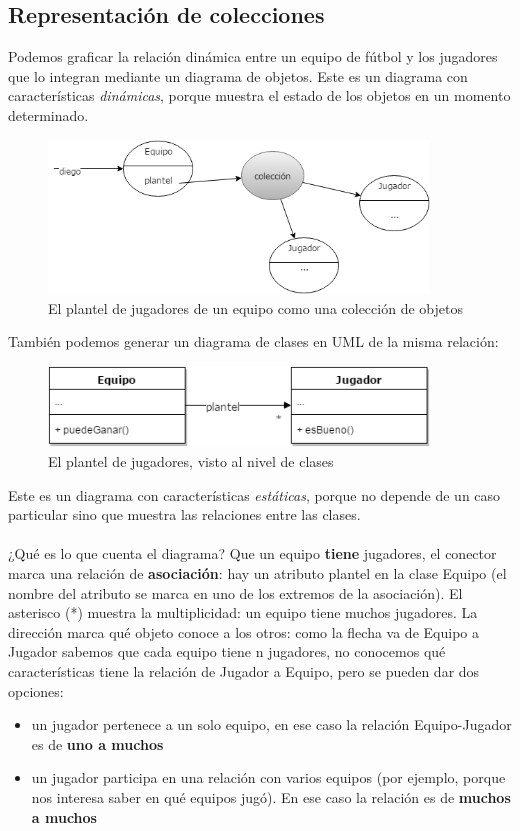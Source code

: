 \documentclass[a4paper,12pt]{book}
\begin{document}
\subsection{Representación de colecciones}
Podemos graficar la relación dinámica entre un equipo de fútbol y los jugadores que lo integran mediante un diagrama
de objetos. Este es un diagrama con características \textit{dinámicas}, porque muestra el estado 
de los objetos en un momento determinado.
\\
\begin{figure}[h!]
    \centering
    \includegraphics[width=0.9\textwidth]{images/02_Diagrama_Objetos_Equipo.png}
    \caption{El plantel de jugadores de un equipo como una colección de objetos}
\end{figure}
\FloatBarrier
También podemos generar un diagrama de clases en UML de la misma relación:
\begin{figure}[h!]
    \centering	
    \includegraphics[width=0.9\textwidth]{images/03_Diagrama_Clases_Equipo.png}
    \caption{El plantel de jugadores, visto al nivel de clases}
\end{figure}
\FloatBarrier
Este es un diagrama con características \textit{estáticas}, porque no depende de un caso particular
sino que muestra las relaciones entre las clases.\\
\\
¿Qué es lo que cuenta el diagrama? Que un equipo \textbf{tiene} jugadores, el conector marca una relación
de \textbf{asociación}: hay un atributo plantel en la clase Equipo (el nombre del atributo se marca en uno
de los extremos de la asociación). El asterisco (*) muestra la multiplicidad: un equipo tiene muchos jugadores.
La dirección marca qué objeto conoce a los otros: como la flecha va de Equipo a Jugador sabemos que cada equipo
tiene n jugadores, no conocemos qué características tiene la relación de Jugador a Equipo, pero se pueden dar
dos opciones:
\begin{itemize}
\item un jugador pertenece a un solo equipo, en ese caso la relación Equipo-Jugador es de \textbf{uno a muchos}
\item un jugador participa en una relación con varios equipos (por ejemplo, porque nos interesa saber
en qué equipos jugó). En ese caso la relación es de \textbf{muchos a muchos}
\end{itemize}
\end{document}
